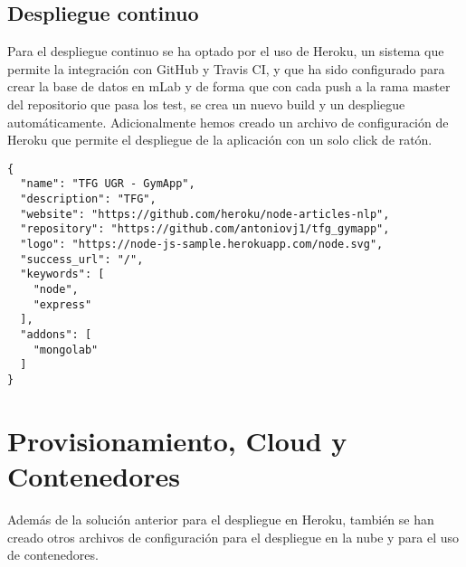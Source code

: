 \subsection {Despliegue continuo}
Para el despliegue continuo se ha optado por el uso de Heroku, un sistema que permite la integración con GitHub y Travis CI, y que ha sido configurado para crear la base de datos en mLab y de forma que con cada push a la rama master del repositorio que pasa los test, se crea un nuevo build y un despliegue automáticamente. Adicionalmente hemos creado un archivo de configuración de Heroku que permite el despliegue de la aplicación con un solo click de ratón.
\begin{lstlisting}
{
  "name": "TFG UGR - GymApp",
  "description": "TFG",
  "website": "https://github.com/heroku/node-articles-nlp",
  "repository": "https://github.com/antoniovj1/tfg_gymapp",
  "logo": "https://node-js-sample.herokuapp.com/node.svg",
  "success_url": "/",
  "keywords": [
    "node",
    "express"
  ],
  "addons": [
    "mongolab"
  ]
}
\end{lstlisting}
\section {Provisionamiento, Cloud y Contenedores}
Además de la solución anterior para el despliegue en Heroku, también se han creado otros archivos de configuración para el despliegue en la nube y para el uso de contenedores.

